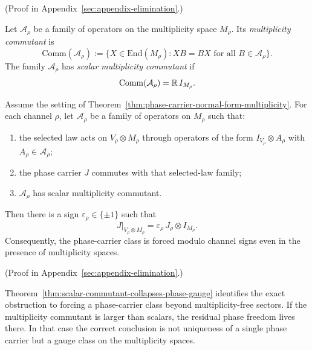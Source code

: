 (Proof in Appendix~\ref{sec:appendix-elimination}.)

\begin{definition}
\label{def:scalar-multiplicity-commutant}
Let $\mathcal A_{\rho}$ be a family of operators on the multiplicity space
$M_{\rho}$. Its \emph{multiplicity commutant} is
\[
\mathrm{Comm}(\mathcal A_{\rho})
:=
\{X\in \mathrm{End}(M_{\rho}) : XB=BX \text{ for all } B\in \mathcal A_{\rho}\}.
\]
The family $\mathcal A_{\rho}$ has \emph{scalar multiplicity commutant} if
\[
\mathrm{Comm}(\mathcal A_{\rho})=\mathbb{R}\,I_{M_{\rho}}.
\]
\end{definition}

\begin{theorem}
\label{thm:scalar-commutant-collapses-phase-gauge}
Assume the setting of
Theorem~\ref{thm:phase-carrier-normal-form-multiplicity}. For each channel
$\rho$, let $\mathcal A_{\rho}$ be a family of operators on $M_{\rho}$ such
that:
\begin{enumerate}[label=(\roman*), leftmargin=2em, itemsep=0.2em]
\item the selected law acts on $V_{\rho}\otimes M_{\rho}$ through operators of
      the form $I_{V_{\rho}}\otimes A_{\rho}$ with $A_{\rho}\in\mathcal A_{\rho}$;
\item the phase carrier $J$ commutes with that selected-law family;
\item $\mathcal A_{\rho}$ has scalar multiplicity commutant.
\end{enumerate}
Then there is a sign $\varepsilon_{\rho}\in\{\pm1\}$ such that
\[
J|_{V_{\rho}\otimes M_{\rho}}
=
\varepsilon_{\rho}\,J_{\rho}\otimes I_{M_{\rho}}.
\]
Consequently, the phase-carrier class is forced modulo channel signs even in
the presence of multiplicity spaces.
\end{theorem}

(Proof in Appendix~\ref{sec:appendix-elimination}.)

\begin{remark}
\label{rem:phase-obstruction-multiplicity-commutant}
Theorem~\ref{thm:scalar-commutant-collapses-phase-gauge} identifies the exact
obstruction to forcing a phase-carrier class beyond multiplicity-free sectors.
If the multiplicity commutant is larger than scalars, the residual phase
freedom lives there. In that case the correct conclusion is not uniqueness of a
single phase carrier but a gauge class on the multiplicity spaces.
\end{remark}

